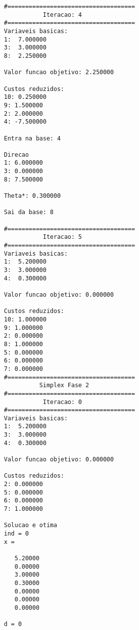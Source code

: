 \documentclass[
	12pt,				%
	openright,			%
	oneside,			%
	a4paper,			%
	english,			%
	french,				%
	spanish,			%
	brazil,				%
	]{abntex2}
\begin{document}
\begin{verbatim}
#====================================
           Iteracao: 4
#====================================
Variaveis basicas:
1:  7.000000
3:  3.000000
8:  2.250000

Valor funcao objetivo: 2.250000

Custos reduzidos:
10: 0.250000
9: 1.500000
2: 2.000000
4: -7.500000

Entra na base: 4

Direcao
1: 6.000000
3: 0.000000
8: 7.500000

Theta*: 0.300000

Sai da base: 8

#====================================
           Iteracao: 5
#====================================
Variaveis basicas:
1:  5.200000
3:  3.000000
4:  0.300000

Valor funcao objetivo: 0.000000

Custos reduzidos:
10: 1.000000
9: 1.000000
2: 0.000000
8: 1.000000
5: 0.000000
6: 0.000000
7: 0.000000
#====================================
          Simplex Fase 2
#====================================
           Iteracao: 0
#====================================
Variaveis basicas:
1:  5.200000
3:  3.000000
4:  0.300000

Valor funcao objetivo: 0.000000

Custos reduzidos:
2: 0.000000
5: 0.000000
6: 0.000000
7: 1.000000

Solucao e otima 
ind = 0
x =

   5.20000
   0.00000
   3.00000
   0.30000
   0.00000
   0.00000
   0.00000

d = 0
\end{verbatim}
%
%
%
%
\end{document}
